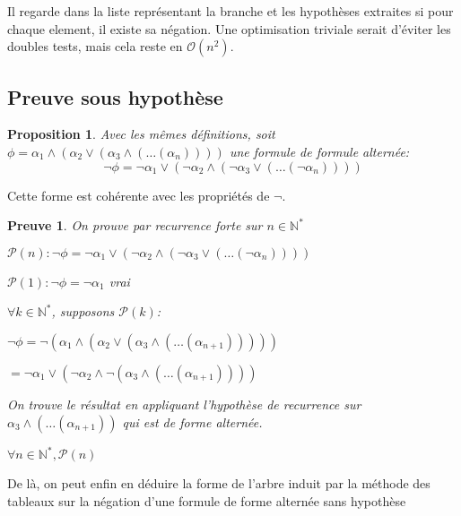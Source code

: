 \documentclass{paper}
\newtheorem{prop}{Proposition}
\newtheorem{preuve}{Preuve}
\begin{document}
Il regarde dans la liste représentant la branche et les hypothèses extraites si pour chaque element, il existe sa négation. Une optimisation triviale serait d'éviter les doubles tests,
mais cela reste en $\mathcal{O}(n^2)$.






\subsection{Preuve sous hypothèse}

\begin{prop}
    Avec les mêmes définitions, soit $\phi = \alpha_1 \land (\alpha_2 \lor (\alpha_3 \land (\dots (\alpha_n))))$ une formule de formule alternée:
    $$\lnot\phi = \lnot\alpha_1 \lor (\lnot\alpha_2 \land (\lnot\alpha_3 \lor (\dots (\lnot\alpha_n))))$$
\end{prop}
Cette forme est cohérente avec les propriétés de $\lnot$.

\begin{preuve}
    On prouve par recurrence forte sur $n\in\mathbb{N}^*$

    $\mathcal{P}(n): \lnot\phi = \lnot\alpha_1 \lor (\lnot\alpha_2 \land (\lnot\alpha_3 \lor (\dots (\lnot\alpha_n))))$

    $\mathcal{P}(1): \lnot\phi = \lnot\alpha_1$ vrai

    $\forall k\in\mathbb{N}^*$, supposons $\mathcal{P}(k)$:

    $\lnot\phi = \lnot (\alpha_1 \land (\alpha_2 \lor (\alpha_3 \land (\dots (\alpha_{n+1})))))$

    $= \lnot\alpha_1 \lor (\lnot\alpha_2 \land \lnot(\alpha_3 \land (\dots (\alpha_{n+1}))))$

    On trouve le résultat en appliquant l'hypothèse de recurrence sur $\alpha_3 \land (\dots (\alpha_{n+1}))$ qui est de forme alternée.

    $\forall n\in\mathbb{N}^*, \mathcal{P}(n)$
\end{preuve}

De là, on peut enfin en déduire la forme de l'arbre induit par la méthode des tableaux sur la négation d'une formule de forme alternée sans hypothèse

\end{document}
